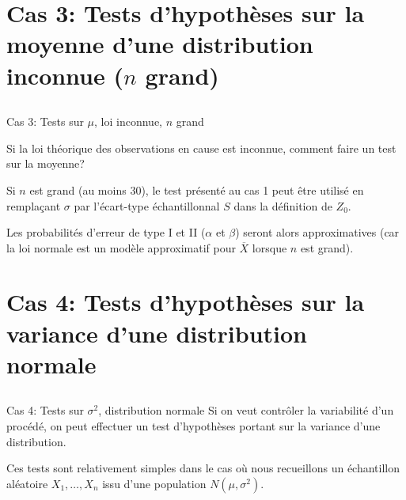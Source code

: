 \documentclass{BeamerTemplate}
\begin{document}
\section[3)Test $\mu$ (loi inconnue)]{Cas 3: Tests d'hypothèses sur la moyenne d'une distribution inconnue ($n$ grand)}
\subsection*{ }

\begin{frame}[t]{Cas 3: Tests sur $\mu$,  loi inconnue, $n$ grand}

Si la loi théorique des observations en cause est inconnue, comment faire un test sur la moyenne?

\vspace{5mm}

Si $n$ est grand (au moins 30), le test présenté au cas 1 peut être utilisé en rempla\c{c}ant $\sigma$ par l'écart-type échantillonnal $S$ dans la définition de $Z_0$.

\vspace{5mm}

Les probabilités d'erreur de type I et II ($\alpha$ et $\beta$) seront alors approximatives (car la loi normale est un modèle approximatif pour $\overline X$ lorsque $n$ est grand).

\end{frame}


\section[4)Test $\sigma^2$]{Cas 4: Tests d'hypothèses sur la variance d'une distribution normale}
\subsection*{ }


\begin{frame}[t]{Cas 4: Tests sur $\sigma^2$, distribution normale}
Si on veut contr\^oler la variabilité d'un procédé,
on peut effectuer un test d'hypothèses portant sur la variance d'une distribution.

\medskip
Ces tests sont relativement simples dans le cas o\`u nous
recueillons un \alert{échantillon aléatoire $X_1,\ldots,X_n$ issu d'une population
$N(\mu,\sigma^2)$}.
\end{frame}
\end{document}
